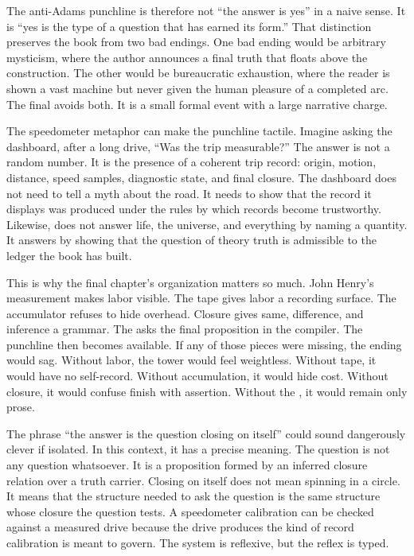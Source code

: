 The anti-Adams punchline is therefore not ``the answer is yes'' in a naive
sense. It is ``yes is the type of a question that has earned its form.'' That
distinction preserves the book from two bad endings. One bad ending would be
arbitrary mysticism, where the author announces a final truth that floats
above the construction. The other would be bureaucratic exhaustion, where the
reader is shown a vast machine but never given the human pleasure of a
completed arc. The final  avoids both. It is a small formal
event with a large narrative charge.

The speedometer metaphor can make the punchline tactile. Imagine asking the
dashboard, after a long drive, ``Was the trip measurable?'' The answer is not
a random number. It is the presence of a coherent trip record: origin, motion,
distance, speed samples, diagnostic state, and final closure. The dashboard
does not need to tell a myth about the road. It needs to show that the record
it displays was produced under the rules by which records become trustworthy.
Likewise,  does not answer life, the universe, and
everything by naming a quantity. It answers by showing that the question of
theory truth is admissible to the ledger the book has built.

This is why the final chapter's organization matters so much. John Henry's
measurement makes labor visible. The tape gives labor a recording surface. The
accumulator refuses to hide overhead. Closure gives same, difference, and
inference a grammar. The  asks the final proposition in the
compiler. The punchline then becomes available. If any of those pieces were
missing, the ending would sag. Without labor, the tower would feel weightless.
Without tape, it would have no self-record. Without accumulation, it would
hide cost. Without closure, it would confuse finish with assertion. Without
the , it would remain only prose.

The phrase ``the answer is the question closing on itself'' could sound
dangerously clever if isolated. In this context, it has a precise meaning. The
question is not any question whatsoever. It is a proposition formed by an
inferred closure relation over a truth carrier. Closing on itself does not
mean spinning in a circle. It means that the structure needed to ask the
question is the same structure whose closure the question tests. A speedometer
calibration can be checked against a measured drive because the drive produces
the kind of record calibration is meant to govern. The system is reflexive,
but the reflex is typed.

